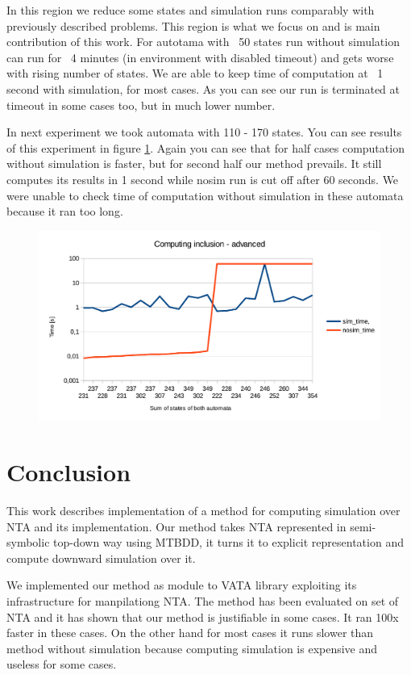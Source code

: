 \documentclass[a4paper, 12pt]{article}
\begin{document}
In this region we reduce some states and simulation runs comparably with previously described problems. This region is what we focus on and is main contribution of this work. For autotama with ~50 states run without simulation can run for ~4 minutes (in environment with disabled timeout) and gets worse with rising number of states. We are able to keep time of computation at ~1 second with simulation, for most cases. As you can see our run is terminated at timeout in some cases too, but in much lower number.

In next experiment we took automata with 110 - 170 states. You can see results of this experiment in figure \ref{fig:g_advanced}. Again you can see that for half cases computation without simulation is faster, but for second half our method  prevails. It still computes its results in 1 second while nosim run is cut off after 60 seconds. We were unable to check time of computation without simulation in these automata because it ran too long.

\begin{figure}[h]
	\centering
	\includegraphics{g_advanced}
	\caption{}
	\label{fig:g_advanced}
\end{figure}

\section{Conclusion}
\label{sec:end}

This work describes implementation of a method for computing simulation over NTA and its implementation.
Our method takes NTA represented in semi-symbolic top-down way using MTBDD, it
turns it to explicit representation and compute downward simulation over it.

We implemented our method as module to VATA library exploiting its infrastructure for manpilationg NTA.
The method has been evaluated on set of NTA and it has shown that our method is justifiable in some cases. It ran 100x faster in these cases. On the other hand for most cases it runs slower than method without simulation because computing simulation is expensive and useless for some cases.
\end{document}
